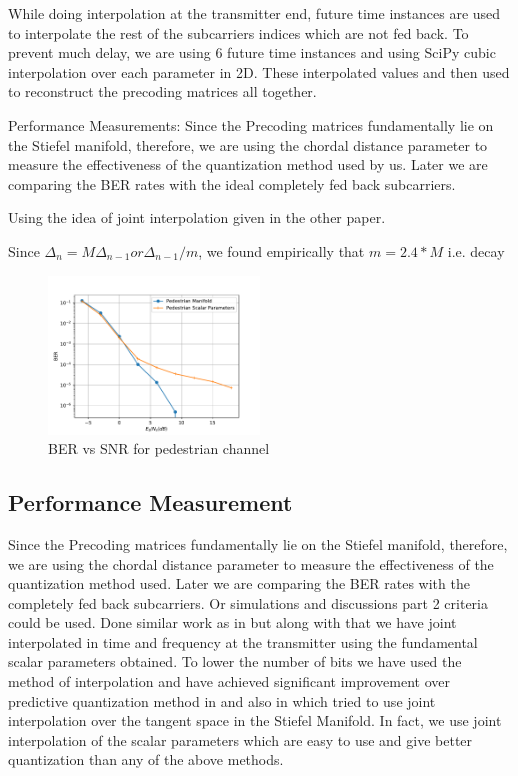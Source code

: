 \documentclass[conference]{IEEEtran}
\begin{document}
While doing interpolation at the transmitter end, future time instances are used to interpolate the rest of the subcarriers indices which are not fed back. To prevent much delay, we are using 6 future time instances and using SciPy cubic interpolation over each parameter in 2D. These interpolated values and then used to reconstruct the precoding matrices all together.

Performance Measurements:
Since the Precoding matrices fundamentally lie on the Stiefel manifold, therefore, we are using the chordal distance parameter to measure the effectiveness of the quantization method used by us. Later we are comparing the BER rates with the ideal completely fed back subcarriers.

Using the idea of joint interpolation given in the other paper.

Since $\Delta_{n} = M\Delta_{n-1} or \Delta_{n-1}/m $, we found empirically that $m=2.4*M$ i.e. decay

\begin{figure}
\includegraphics[width=0.5\textwidth]{images/pedestrian.pdf}
\caption{BER vs SNR for pedestrian channel}
\label{ber_overview}
\vspace{-5pt}
\end{figure}

\subsection{Performance Measurement}

\label{setting}



\noindent Since the Precoding matrices fundamentally lie on the Stiefel manifold, therefore, we are using the chordal distance parameter to measure the effectiveness of the quantization method used. Later we are comparing the BER rates with the completely fed back subcarriers. Or simulations and discussions part 2 criteria could be used. Done similar work as in \cite{4114278} but along with that we have joint interpolated in time and frequency at the transmitter using the fundamental scalar parameters obtained. To lower the number of bits we have used the method of interpolation and have achieved significant improvement over predictive quantization method in \cite{6891198} and also in \cite{Gupt1905:Predictive} which tried to use joint interpolation over the tangent space in the Stiefel Manifold. In fact, we use joint interpolation of the scalar parameters which are easy to use and give better quantization than any of the above methods.
\end{document}
